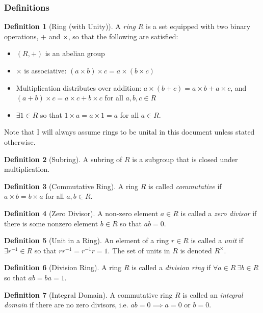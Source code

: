 \documentclass{article}
\theoremstyle{definition}
\newtheorem{definition}{Definition}[subsection]
\begin{document}
\subsubsection{Definitions}
    \begin{definition}[Ring (with Unity)]
        A \textit{ring} $R$ is a set equipped with two binary operations, $+$ and $\times$, so that the following are satisfied:
        \begin{itemize}
            \item $(R,+)$ is an abelian group
            \item $\times$ is associative: $(a\times b)\times c = a\times(b\times c)$
            \item Multiplication distributes over addition: $a\times(b+c)=a\times b + a\times c$, and $(a+b)\times c = a\times c + b\times c$ for all $a,b,c\in R$
            \item $\exists 1\in R$ so that $1\times a = a\times 1 = a$ for all $a\in R$.
        \end{itemize} 
        Note that I will always assume rings to be unital in this document unless stated otherwise.
    \end{definition}
    \begin{definition}[Subring]
        A subring of $R$ is a subgroup that is closed under multiplication.
    \end{definition}
    \begin{definition}[Commutative Ring]
        A ring $R$ is called \textit{commutative} if $a\times b = b\times a$ for all $a,b\in R$.
    \end{definition}
    \begin{definition}[Zero Divisor]
        A non-zero element $a\in R$ is called a \textit{zero divisor} if there is some nonzero element $b\in R$ so that $ab=0$.
    \end{definition}
    \begin{definition}[Unit in a Ring]
        An element of a ring $r\in R$ is called a \textit{unit} if $\exists r^{-1}\in R$ so that $rr^{-1}=r^{-1}r=1$. The set of units in $R$ is denoted $R^\times$.
    \end{definition}
    \begin{definition}[Division Ring]
        A ring $R$ is called a \textit{division ring} if $\forall a\in R\ \exists b\in R$ so that $ab=ba=1$.
    \end{definition}
    \begin{definition}[Integral Domain]
        A commutative ring $R$ is called an \textit{integral domain} if there are no zero divisors, i.e. $ab=0\implies a=0$ or $b=0$.
    \end{definition}
\end{document}
